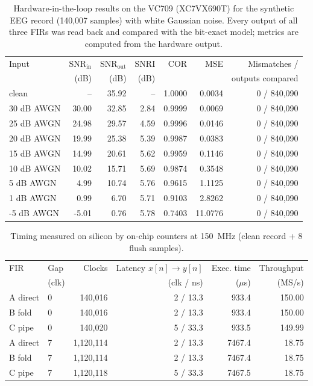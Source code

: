 \begin{table}[t]\centering
\caption{Hardware-in-the-loop results on the VC709 (XC7VX690T) for the synthetic EEG record (140,007 samples) with white Gaussian noise. Every output of all three FIRs was read back and compared with the bit-exact model; metrics are computed from the hardware output.}
\label{tab:hw_eeg}\small
\begin{tabular}{lrrrrrr}\hline
Input & SNR$_\mathrm{in}$ & SNR$_\mathrm{out}$ & SNRI & COR & MSE & Mismatches / \\
 & (dB) & (dB) & (dB) & & & outputs compared \\ \hline
clean & -- & 35.92 & -- & 1.0000 & 0.0034 & 0 / 840,090 \\
30 dB AWGN & 30.00 & 32.85 & 2.84 & 0.9999 & 0.0069 & 0 / 840,090 \\
25 dB AWGN & 24.98 & 29.57 & 4.59 & 0.9996 & 0.0146 & 0 / 840,090 \\
20 dB AWGN & 19.99 & 25.38 & 5.39 & 0.9987 & 0.0383 & 0 / 840,090 \\
15 dB AWGN & 14.99 & 20.61 & 5.62 & 0.9959 & 0.1146 & 0 / 840,090 \\
10 dB AWGN & 10.02 & 15.71 & 5.69 & 0.9874 & 0.3548 & 0 / 840,090 \\
5 dB AWGN & 4.99 & 10.74 & 5.76 & 0.9615 & 1.1125 & 0 / 840,090 \\
1 dB AWGN & 0.99 & 6.70 & 5.71 & 0.9103 & 2.8262 & 0 / 840,090 \\
-5 dB AWGN & -5.01 & 0.76 & 5.78 & 0.7403 & 11.0776 & 0 / 840,090 \\
\hline\end{tabular}\end{table}

\begin{table}[t]\centering
\caption{Timing measured on silicon by on-chip counters at 150~MHz (clean record + 8 flush samples).}
\label{tab:hw_timing}\small
\begin{tabular}{llrrrr}\hline
FIR & Gap & Clocks & Latency $x[n]\!\to\!y[n]$ & Exec. time & Throughput \\
 & (clk) & & (clk / ns) & ($\mu$s) & (MS/s) \\ \hline
A direct & 0 & 140,016 & 2 / 13.3 & 933.4 & 150.00 \\
B fold & 0 & 140,016 & 2 / 13.3 & 933.4 & 150.00 \\
C pipe & 0 & 140,020 & 5 / 33.3 & 933.5 & 149.99 \\
A direct & 7 & 1,120,114 & 2 / 13.3 & 7467.4 & 18.75 \\
B fold & 7 & 1,120,114 & 2 / 13.3 & 7467.4 & 18.75 \\
C pipe & 7 & 1,120,118 & 5 / 33.3 & 7467.5 & 18.75 \\
\hline\end{tabular}\end{table}
